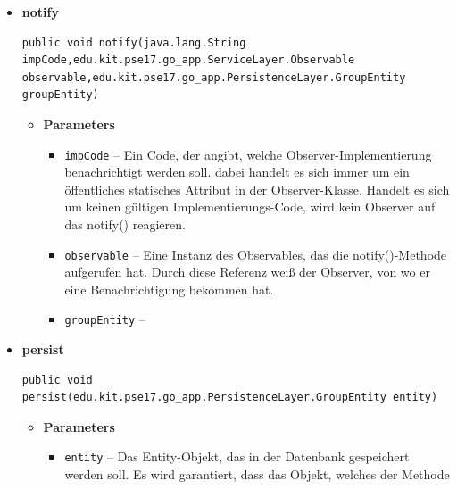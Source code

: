 \documentclass[11pt,a4paper]{article}
\begin{document}
{{{{{{{{{{{{{\begin{itemize}
{\begin{itemize}
{}%
\end{itemize}
}%
\item{ 
\hypertarget{edu.kit.pse17.go_app.PersistenceLayer.daos.GroupDaoImp.notify(java.lang.String, edu.kit.pse17.go_app.ServiceLayer.Observable, edu.kit.pse17.go_app.PersistenceLayer.GroupEntity)}{{\bf  notify}\\}
\begin{lstlisting}[frame=none]
public void notify(java.lang.String impCode,edu.kit.pse17.go_app.ServiceLayer.Observable observable,edu.kit.pse17.go_app.PersistenceLayer.GroupEntity groupEntity)\end{lstlisting} %
\begin{itemize}
\item{
{\bf  Parameters}
  \begin{itemize}
   \item{
\texttt{impCode} -- Ein Code, der angibt, welche Observer-Implementierung benachrichtigt werden soll. dabei handelt es sich immer um ein öffentliches statisches Attribut in der Observer-Klasse. Handelt es sich um keinen gültigen Implementierungs-Code, wird kein Observer auf das notify() reagieren.}
   \item{
\texttt{observable} -- Eine Instanz des Observables, das die notify()-Methode aufgerufen hat. Durch diese Referenz weiß der Observer, von wo er eine Benachrichtigung bekommen hat.}
   \item{
\texttt{groupEntity} -- }
  \end{itemize}
}%
\end{itemize}
}%
\item{ 
\hypertarget{edu.kit.pse17.go_app.PersistenceLayer.daos.GroupDaoImp.persist(edu.kit.pse17.go_app.PersistenceLayer.GroupEntity)}{{\bf  persist}\\}
\begin{lstlisting}[frame=none]
public void persist(edu.kit.pse17.go_app.PersistenceLayer.GroupEntity entity)\end{lstlisting} %
\begin{itemize}
\item{
{\bf  Parameters}
  \begin{itemize}
   \item{
\texttt{entity} -- Das Entity-Objekt, das in der Datenbank gespeichert werden soll. Es wird garantiert, dass das Objekt, welches der Methode}
  \end{itemize}
}
\end{itemize}}
\end{itemize}}}}}}}}}}}}}}
\end{document}
